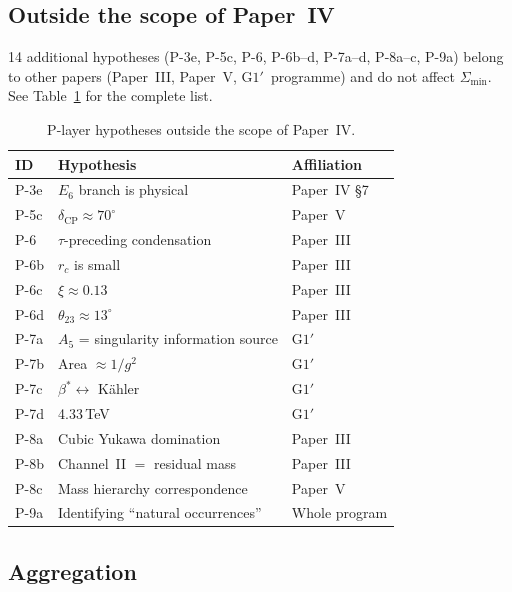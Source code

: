 \documentclass[sn-mathphys-num,Numbered]{sn-jnl}
\theoremstyle{thmstyleone}
\theoremstyle{thmstylethree}
\newcommand{\Amin}{\Sigma_{\min}}
\begin{document}
\begin{appendices}
\subsection{Outside the scope of Paper~IV}

14 additional hypotheses (P-3e, P-5c, P-6, P-6b--d, P-7a--d, P-8a--c, P-9a)
belong to other papers (Paper~III, Paper~V, $\mathrm{G1}'$~programme) and do
not affect $\Amin$.  See Table~\ref{tab:C4} for the complete list.

\begin{table}[htb]
\centering
\caption{P-layer hypotheses outside the scope of Paper~IV.}\label{tab:C4}
\begin{tabular}{lll}
\toprule
ID & Hypothesis & Affiliation \\
\midrule
P-3e & $E_6$ branch is physical & Paper~IV \S7 \\
P-5c & $\delta_{\mathrm{CP}} \approx 70^\circ$ & Paper~V \\
P-6 & $\tau$-preceding condensation & Paper~III \\
P-6b & $r_c$ is small & Paper~III \\
P-6c & $\xi \approx 0.13$ & Paper~III \\
P-6d & $\theta_{23} \approx 13^\circ$ & Paper~III \\
P-7a & $A_5$ = singularity information source & $\mathrm{G1}'$ \\
P-7b & Area $\approx 1/g^2$ & $\mathrm{G1}'$ \\
P-7c & $\beta^* \leftrightarrow$ K\"ahler & $\mathrm{G1}'$ \\
P-7d & 4.33\,TeV & $\mathrm{G1}'$ \\
P-8a & Cubic Yukawa domination & Paper~III \\
P-8b & Channel~II $=$ residual mass & Paper~III \\
P-8c & Mass hierarchy correspondence & Paper~V \\
P-9a & Identifying ``natural occurrences'' & Whole program \\
\bottomrule
\end{tabular}
\end{table}


\subsection{Aggregation}


\end{appendices}
\end{document}
